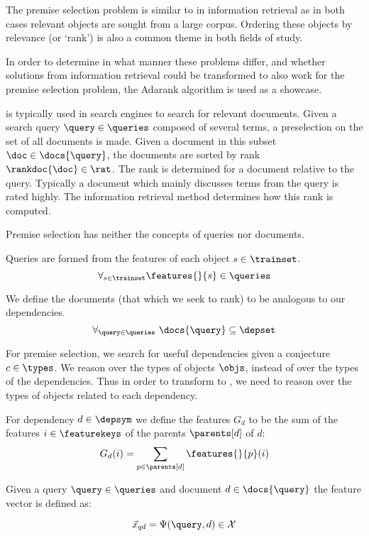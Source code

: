 The premise selection problem is similar to \ltr in information retrieval
as in both cases relevant objects are sought from a large corpus.
Ordering these objects by relevance (or `rank') is also a common theme in both fields of study.

In order to determine in what manner these problems differ, and whether solutions
from information retrieval could be transformed to also work for the premise selection problem,
the Adarank algorithm \cite{xu2007adarank} is used as a showcase.

\ltr is typically used in search engines to search for relevant documents.
Given a search query $\query \in \queries$ composed of several terms, a preselection on the set of
all documents is made. Given a document in this subset $\doc \in \docs{\query}$,
the documents are sorted by rank $\rankdoc{\doc} \in \rat$.
The rank is determined for a document relative to the query.
Typically a document which mainly discusses terms from the query is rated highly.
The information retrieval method determines how this rank is computed.

Premise selection has neither the concepts of queries nor documents.

\begin{definition}
  Queries are formed from the features of each object $s \in \trainset$.
  \[
    \forall_{s \in \trainset} \features{}{s} \in \queries
  \]
\end{definition}

\begin{definition}
  We define the documents (that which we seek to rank) to be analogous to our dependencies.
  \[
    \forall_{\query \in \queries}~ \docs{\query} \subseteq \depset
  \]
\end{definition}

For premise selection, we search for useful dependencies given a conjecture $c \in \types$.
We reason over the types of objects $\objs$, instead of over the types of the dependencies.
Thus in order to transform to \ltr, we need to reason over the types of objects related to each dependency.

\begin{definition}
  For dependency $d \in \depsym$ we define the features $G_d$ to be the sum of
  the features $i \in \featurekeys$ of the parents $\parents[d]$ of $d$:
  \[
    G_d(i) = \sum_{p \in \parents[d]} \features{}{p}(i)
  \]
\end{definition}

\begin{definition}
  Given a query $\query \in \queries$ and document $d \in \docs{\query}$ the feature
  vector is defined as:

  \[
    {\vec{x}}_{q d} = \Psi(\query, d) \in \mathcal{X}
  \]
\end{definition}

